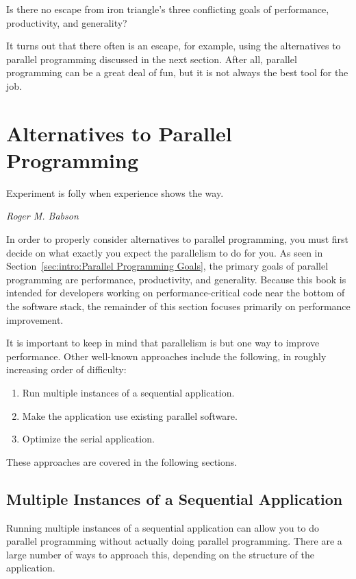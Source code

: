 Is there no escape from iron triangle's three conflicting goals of
performance, productivity, and generality?

It turns out that there often is an escape, for example,
using the alternatives to parallel programming discussed in the next section.
After all, parallel programming can be a great deal of fun, but
it is not always the best tool for the job.

\section{Alternatives to Parallel Programming}
\label{sec:intro:Alternatives to Parallel Programming}
%
\epigraph{Experiment is folly when experience shows the way.}
	 {\emph{Roger M. Babson}}

In order to properly consider alternatives to parallel programming,
you must first decide on what exactly you expect the parallelism
to do for you.
As seen in Section~\ref{sec:intro:Parallel Programming Goals},
the primary goals of parallel programming are performance, productivity,
and generality.
Because this book is intended for developers working on
performance-critical code near the bottom of the software stack,
the remainder of this section focuses primarily on performance improvement.

It is important to keep in mind that parallelism is but one way to
improve performance.
Other well-known approaches include the following, in roughly increasing
order of difficulty:

\begin{enumerate}
\item	Run multiple instances of a sequential application.
\item	Make the application use existing parallel software.
\item	Optimize the serial application.
\end{enumerate}

These approaches are covered in the following sections.

\subsection{Multiple Instances of a Sequential Application}
\label{sec:intro:Multiple Instances of a Sequential Application}

Running multiple instances of a sequential application can allow you
to do parallel programming without actually doing parallel programming.
There are a large number of ways to approach this, depending on the
structure of the application.

